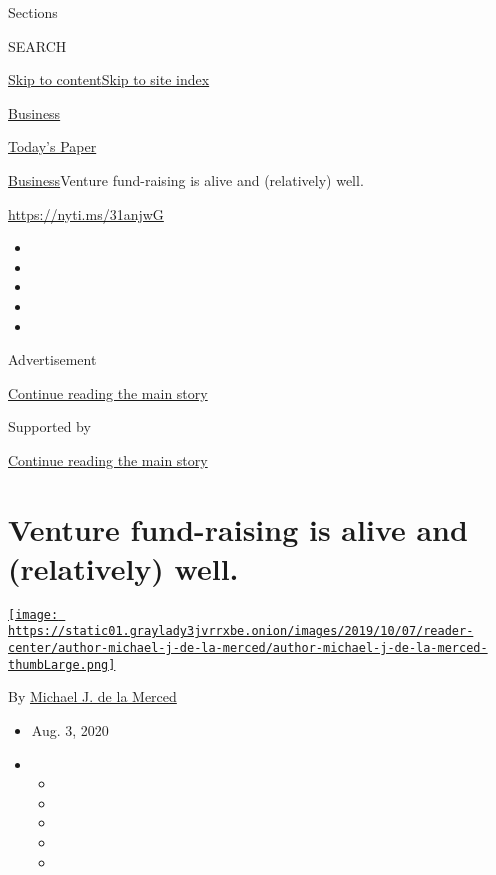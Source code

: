 Sections

SEARCH

\protect\hyperlink{site-content}{Skip to
content}\protect\hyperlink{site-index}{Skip to site index}

\href{https://www.nytimes3xbfgragh.onion/section/business}{Business}

\href{https://myaccount.nytimes3xbfgragh.onion/auth/login?response_type=cookie\&client_id=vi}{}

\href{https://www.nytimes3xbfgragh.onion/section/todayspaper}{Today's
Paper}

\href{/section/business}{Business}\textbar{}Venture fund-raising is
alive and (relatively) well.

\url{https://nyti.ms/31anjwG}

\begin{itemize}
\item
\item
\item
\item
\item
\end{itemize}

Advertisement

\protect\hyperlink{after-top}{Continue reading the main story}

Supported by

\protect\hyperlink{after-sponsor}{Continue reading the main story}

\hypertarget{venture-fund-raising-is-alive-and-relatively-well}{%
\section{Venture fund-raising is alive and (relatively)
well.}\label{venture-fund-raising-is-alive-and-relatively-well}}

\href{https://www.nytimes3xbfgragh.onion/by/michael-j-de-la-merced}{\texttt{[image: https://static01.graylady3jvrrxbe.onion/images/2019/10/07/reader-center/author-michael-j-de-la-merced/author-michael-j-de-la-merced-thumbLarge.png]}}

By
\href{https://www.nytimes3xbfgragh.onion/by/michael-j-de-la-merced}{Michael
J. de la Merced}

\begin{itemize}
\item
  Aug. 3, 2020
\item
  \begin{itemize}
  \item
  \item
  \item
  \item
  \item
  \end{itemize}
\end{itemize}

